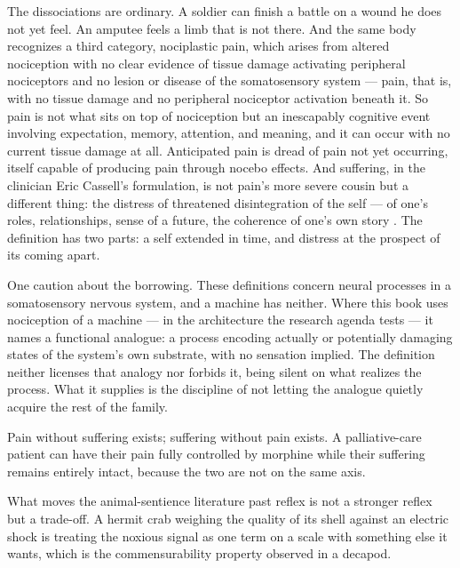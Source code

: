 The dissociations are ordinary. A soldier can finish a battle on a wound he does not yet feel. An amputee feels a limb that is not there. And the same body recognizes a third category, nociplastic pain, which arises from altered nociception with no clear evidence of tissue damage activating peripheral nociceptors and no lesion or disease of the somatosensory system \autocite{iasp2024terminology} — pain, that is, with no tissue damage and no peripheral nociceptor activation beneath it. So pain is not what sits on top of nociception but an inescapably cognitive event involving expectation, memory, attention, and meaning, and it can occur with no current tissue damage at all. Anticipated pain is dread of pain not yet occurring, itself capable of producing pain through nocebo effects. And suffering, in the clinician Eric Cassell's formulation, is not pain's more severe cousin but a different thing: the distress of threatened disintegration of the self — of one's roles, relationships, sense of a future, the coherence of one's own story \autocite{cassell1982suffering}. The definition has two parts: a self extended in time, and distress at the prospect of its coming apart.

One caution about the borrowing. These definitions concern neural processes in a somatosensory nervous system, and a machine has neither. Where this book uses nociception of a machine — in the architecture the research agenda tests — it names a functional analogue: a process encoding actually or potentially damaging states of the system's own substrate, with no sensation implied. The definition neither licenses that analogy nor forbids it, being silent on what realizes the process. What it supplies is the discipline of not letting the analogue quietly acquire the rest of the family.

Pain without suffering exists; suffering without pain exists. A palliative-care patient can have their pain fully controlled by morphine while their suffering remains entirely intact, because the two are not on the same axis.

What moves the animal-sentience literature past reflex is not a stronger reflex but a trade-off. A hermit crab weighing the quality of its shell against an electric shock \autocite{elwood2009pain} is treating the noxious signal as one term on a scale with something else it wants, which is the commensurability property observed in a decapod.

